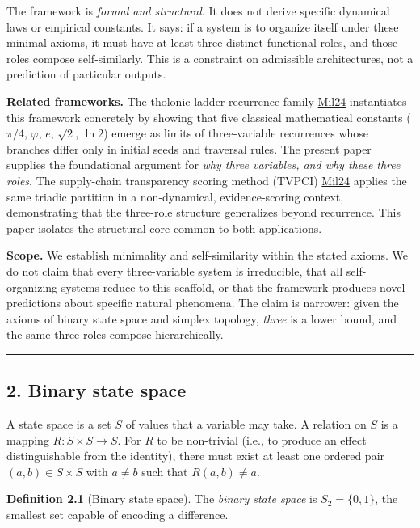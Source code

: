 \documentclass[
  11pt,
  letterpaper,
]{article}
\begin{document}
The framework is \emph{formal and structural}. It does not derive
specific dynamical laws or empirical constants. It says: if a system is
to organize itself under these minimal axioms, it must have at least
three distinct functional roles, and those roles compose self-similarly.
This is a constraint on admissible architectures, not a prediction of
particular outputs.

\textbf{Related frameworks.} The tholonic ladder recurrence family
\href{https://tholonia.github.io/the-book/}{Mil24} instantiates this
framework concretely by showing that five classical mathematical
constants (\(\pi/4\), \(\varphi\), \(e\), \(\sqrt{2}\), \(\ln 2\))
emerge as limits of three-variable recurrences whose branches differ
only in initial seeds and traversal rules. The present paper supplies
the foundational argument for \emph{why three variables, and why these
three roles}. The supply-chain transparency scoring method (TVPCI)
\href{https://tholonia.github.io/the-book/}{Mil24} applies the same
triadic partition in a non-dynamical, evidence-scoring context,
demonstrating that the three-role structure generalizes beyond
recurrence. This paper isolates the structural core common to both
applications.

\textbf{Scope.} We establish minimality and self-similarity within the
stated axioms. We do not claim that every three-variable system is
irreducible, that all self-organizing systems reduce to this scaffold,
or that the framework produces novel predictions about specific natural
phenomena. The claim is narrower: given the axioms of binary state space
and simplex topology, \emph{three} is a lower bound, and the same three
roles compose hierarchically.

\begin{center}\rule{0.5\linewidth}{0.5pt}\end{center}

\subsection{2. Binary state space}\label{binary-state-space}

A state space is a set \(S\) of values that a variable may take. A
relation on \(S\) is a mapping \(R: S \times S \to S\). For \(R\) to be
non-trivial (i.e., to produce an effect distinguishable from the
identity), there must exist at least one ordered pair
\((a, b) \in S \times S\) with \(a \neq b\) such that
\(R(a, b) \neq a\).

\textbf{Definition 2.1} (Binary state space). The \emph{binary state
space} is \(S_2 = \{0, 1\}\), the smallest set capable of encoding a
difference.
\end{document}

